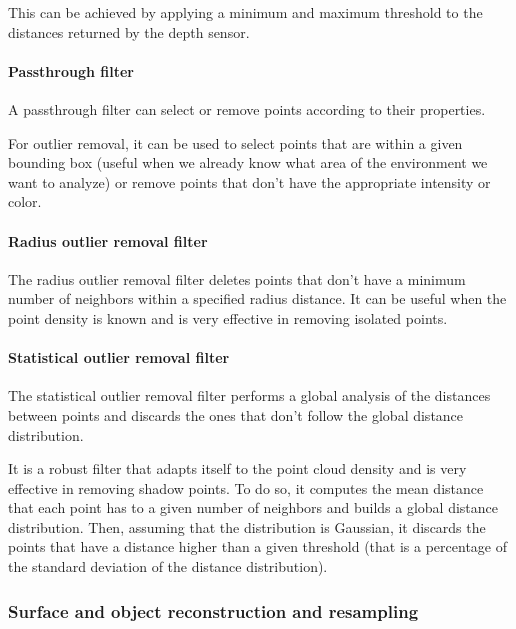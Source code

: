 This can be achieved by applying a minimum and maximum threshold to the distances returned by the depth sensor.


\paragraph{Passthrough filter}

A passthrough filter can select or remove points according to their properties.

For outlier removal, it can be used to select points that are within a given bounding box (useful when we already know what area of the environment we want to analyze) or remove points that don't have the appropriate intensity or color.


\paragraph{Radius outlier removal filter}

The radius outlier removal filter deletes points that don't have a minimum number of neighbors within a specified radius distance. It can be useful when the point density is known and is very effective in removing isolated points.


\paragraph{Statistical outlier removal filter}

The statistical outlier removal filter \cite{Rusu2010a} performs a global analysis of the distances between points and discards the ones that don't follow the global distance distribution.

It is a robust filter that adapts itself to the point cloud density and is very effective in removing shadow points. To do so, it computes the mean distance that each point has to a given number of neighbors and builds a global distance distribution. Then, assuming that the distribution is Gaussian, it discards the points that have a distance higher than a given threshold (that is a percentage of the standard deviation of the distance distribution).


\subsubsection{Surface and object reconstruction and resampling}\label{subsec:localization_system_surface-reconstruction-resampling}


